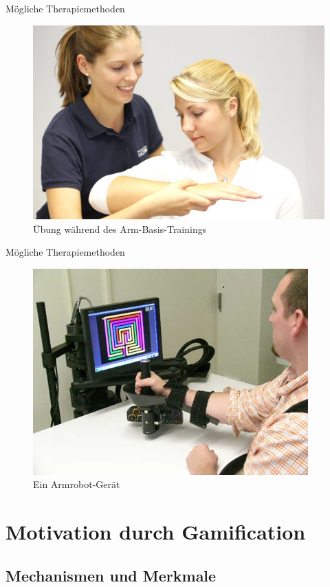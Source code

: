 \documentclass[hyphens]{beamer}
\begin{document}
\begin{frame}{Mögliche Therapiemethoden}
\begin{figure}
	\includegraphics[scale=0.2]{pics/armbasis}
	\caption{Übung während des Arm-Basis-Trainings}
\end{figure}
\end{frame}

\begin{frame}{Mögliche Therapiemethoden}
\begin{figure}
	\includegraphics[scale=0.6]{pics/armrobot}
	\caption{Ein Armrobot-Gerät}
\end{figure}
\end{frame}

\section{Motivation durch Gamification}

\subsection{Mechanismen und Merkmale}
\end{document}
